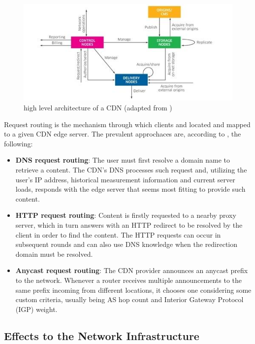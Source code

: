 \documentclass[
  oneside,
  11pt, a4paper,
  footinclude=true,
  headinclude=true,
  cleardoublepage=empty
]{scrbook}
\begin{document}
	\begin{figure}[!h]
    \centering
    \includegraphics[scale=8.0]{img/cdn-architecture.jpg}
    \caption{high level architecture of a CDN (adapted from \cite{global-dots})}
    \label{fig:cdn-architecture}
    \end{figure}
	
	Request routing is the mechanism through which clients and located and mapped to a given CDN edge server. The prevalent approchaces are, according to \cite{wichtlhuber2017}, the following:
	
	\begin{itemize}
	    \item \textbf{DNS request routing}: The user must first resolve a domain name to retrieve a content. The CDN's DNS processes such request and, utilizing the user's IP address, historical measurement information and current server loads, responds with the edge server that seems most fitting to provide such content.
	    \item \textbf{HTTP request routing}: Content is firstly requested to a nearby proxy server, which in turn answers with an HTTP redirect to be resolved by the client in order to find the content. The HTTP requests can occur in subsequent rounds and can also use DNS knowledge when the redirection domain must be resolved.
	    \item \textbf{Anycast request routing}: The CDN provider announces an anycast prefix to the network. Whenever a router receives multiple announcements to the same prefix incoming from different locations, it chooses one considering some custom criteria, usually being AS hop count and Interior Gateway Protocol (IGP) weight.
	\end{itemize}{}
	
	\subsection{Effects to the Network Infrastructure}
	
\end{document}
